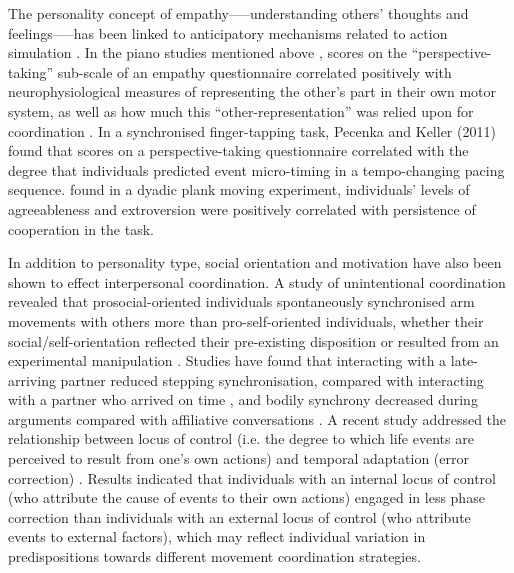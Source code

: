 \begin{CJK}{UTF8}{gbsn}
The personality concept of empathy—--understanding others’ thoughts and feelings—--has been linked to anticipatory mechanisms related to action simulation \citep{Sevdalis2014,Keller2014}.  In the piano studies mentioned above \citep{Novembre2012}, scores on the ``perspective-taking'' sub-scale of an empathy questionnaire correlated positively with neurophysiological measures of representing the other’s part in their own motor system, as well as how much this ``other-representation'' was relied upon for coordination \citep{Novembre2014a}.  In a synchronised finger-tapping task, Pecenka and Keller (2011) found that scores on a perspective-taking questionnaire correlated with the degree that individuals predicted event micro-timing in a tempo-changing pacing sequence.  \textcite{Richardson2007} found in a dyadic plank moving experiment, individuals’ levels of agreeableness and extroversion were positively correlated with persistence of cooperation in the task.

In addition to personality type, social orientation and motivation have also been shown to effect interpersonal coordination.  A study of unintentional coordination revealed that prosocial-oriented individuals spontaneously synchronised arm movements with others more than pro-self-oriented individuals, whether their social/self-orientation reflected their pre-existing disposition or resulted from an experimental manipulation \citep{Lumsden2012}.  Studies have found that interacting with a late-arriving partner reduced stepping synchronisation, compared with interacting with a partner who arrived on time \citep{Miles2010}, and bodily synchrony decreased during arguments compared with affiliative conversations \citep{Paxton2013}.  A recent study addressed the relationship between locus of control (i.e. the degree to which life events are perceived to result from one’s own actions) and temporal adaptation (error correction) \citep{Fairhurst2014}.   Results indicated that individuals with an internal locus of control (who attribute the cause of events to their own actions) engaged in less phase correction than individuals with an external locus of control (who attribute events to external factors), which may reflect individual variation in predispositions towards different movement coordination strategies.


\end{CJK}

